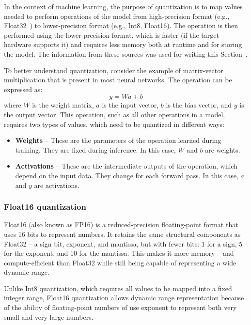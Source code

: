 In the context of machine learning, the purpose of quantization is to map values needed to perform operations of the model from high-precision format (e.g., Float32~\cite{ieee754}) to lower-precision format (e.g., Int8, Float16). The operation is then performed using the lower-precision format, which is faster (if the target hardware supports it) and requires less memory both at runtime and for storing the model. The information from these sources was used for writing this Section~\cite{quantization_whitepaper, nvidia_whitepaper}.

To better understand quantization, consider the example of matrix-vector multiplication that is present in most neural networks. The operation can be expressed as:
\begin{equation}
    y = Wa + b
\end{equation}
where $W$ is the weight matrix, $a$ is the input vector, $b$ is the bias vector, and $y$ is the output vector. This operation, such as all other operations in a model, requires two types of values, which need to be quantized in different ways:
\begin{itemize}
    \item \textbf{Weights} -- These are the parameters of the operation learned during training. They are fixed during inference. In this case, $W$ and $b$ are weights.
    \item \textbf{Activations} -- These are the intermediate outputs of the operation, which depend on the input data. They change for each forward pass. In this case, $a$ and $y$ are activations.
\end{itemize}

\subsubsection*{Float16 quantization}

Float16 (also known as FP16) is a reduced-precision floating-point format that uses 16 bits to represent numbers. It retains the same structural components as Float32 -- a sign bit, exponent, and mantissa, but with fewer bits: 1 for a sign, 5 for the exponent, and 10 for the mantissa. This makes it more memory -- and compute-efficient than Float32 while still being capable of representing a wide dynamic range.

Unlike Int8 quantization, which requires all values to be mapped into a fixed integer range, Float16 quantization allows dynamic range representation because of the ability of floating-point numbers of use exponent to represent both very small and very large numbers.

